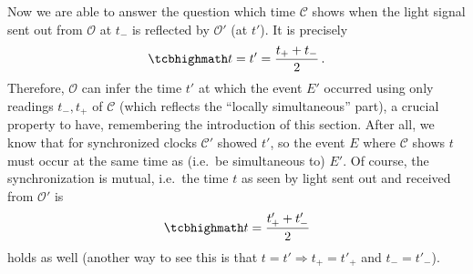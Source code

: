 Now we are able to answer the question which time $\mathcal{C}$ shows when the light signal sent out from $\mathcal{O}$ at $t_-$ is reflected by $\mathcal{O}'$ (at $t'$). It is precisely
\begin{equation}\label{eq:simult_explicit}
	\eqbox{
	t = t' = \frac{t_+ + t_-}{2}
	} \, .
\end{equation}
Therefore, $\mathcal{O}$ can infer the time $t'$ at which the event $E'$ occurred using only readings $t_-, t_+$ of $\mathcal{C}$ (which reflects the \enquote{locally simultaneous} part), a crucial property to have, remembering the introduction of this section. After all, we know that for synchronized clocks $\mathcal{C}'$ showed $t'$, so the event $E$ where $\mathcal{C}$ shows $t$ must occur at the same time as (i.e.~be simultaneous to) $E'$. Of course, the synchronization is mutual, i.e.~the time $t$ as seen by light sent out and received from $\mathcal{O}'$ is
\begin{equation}
	\eqbox{
	t = \frac{t'_+ + t'_-}{2}
	}
\end{equation}
holds as well (another way to see this is that $t = t' \Rightarrow t_+ = t'_+$ and $t_- = t'_-$).

